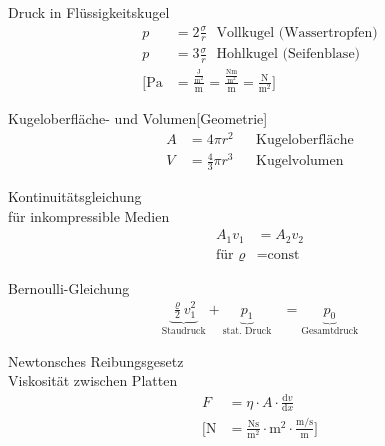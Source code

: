\begin{karte}{Druck in Flüssigkeitskugel}
    \begin{align*}
        p &= 2\frac{\sigma}{r} \text{~~Vollkugel (Wassertropfen)}\\
        p &= 3\frac{\sigma}{r} \text{~~Hohlkugel (Seifenblase)} \\
        \Bigg[ \si{\pascal} &= \frac{\frac{\si{\joule}}{\si{\square\meter}}}{\si{\meter}}  = \frac{\frac{\si{\newton\meter}}{\si{\square\meter}}}{\si{\meter}}  = \frac{\si{\newton}}{\si{\square\meter}} \Bigg]
    \end{align*}
\end{karte}

\begin{karte}{Kugeloberfläche- und Volumen}[Geometrie]
    \begin{align*}
        A &= 4\pi r^2 &&\text{Kugeloberfläche} \\
        V &= \frac{4}{3}\pi r^3 &&\text{Kugelvolumen}
    \end{align*}
\end{karte}

\begin{karte}{Kontinuitätsgleichung\\für inkompressible Medien}
    \begin{align*}
        A_1 v_1 &= A_2 v_2 \\
        \text{für } \varrho &= \text{const}
    \end{align*}
\end{karte}

\begin{karte}{Bernoulli-Gleichung}
    \begin{align*}
        \underbrace{\frac{\varrho}{2}v_1^2}_\text{Staudruck} + \underbrace{p_1}_\text{stat. Druck} &= \underbrace{p_0}_\text{Gesamtdruck}
    \end{align*}
\end{karte}

\begin{karte}{Newtonsches Reibungsgesetz \\  Viskosität zwischen Platten}
    \begin{align*}
        F  &=  \eta \cdot A \cdot \frac{\mathrm dv}{\mathrm dx} \\
        \bigg[ \si{\newton} &= \frac{\si{\newton\second}}{\si{\square\meter}} \cdot \si{\square\meter} \cdot \frac{\si{\meter\per\second}}{\si{\meter}} 
            \bigg]
    \end{align*}
\end{karte}

